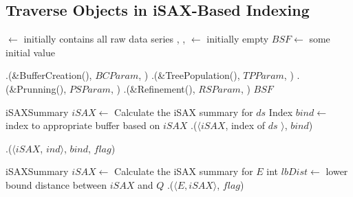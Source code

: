 \subsection{Traverse Objects in iSAX-Based Indexing}

\begin{algorithm}[htbp]
    \footnotesize
    \vspace*{2mm}
    
    \begin{algorithmic}[1]
    
        \State \BC $\gets$ initially contains all raw data series
        \State \TP, \PS, \RS $\gets$ initially empty
        \State $\mathit{BSF} \gets$ some initial value
    \EndProcedure
    
    \vspace*{1mm}
    \vspace*{1mm}

        \State \BC.\Traverse(\&BufferCreation(), $\mathit{BCParam}$, \False)
        \State \TP.\Traverse(\&TreePopulation(), $\mathit{TPParam}$, \False)
        \State \PS.\Traverse(\&Prunning(), $\mathit{PSParam}$, \False)
        \State \RS.\Traverse(\&Refinement(), $\mathit{RSParam}$, \True)
        \State \Return $\mathit{BSF}$
    \EndProcedure
    
    \vspace*{1mm}
        \State iSAXSummary $\mathit{iSAX} \gets$ Calculate the iSAX summary for $\mathit{ds}$
        \State Index $\mathit{bind} \gets$ index to appropriate buffer based on $\mathit{iSAX}$
        \State \TP.\Put($\langle \mathit{iSAX}$, index of $\mathit{ds}$ $\rangle$, $\mathit{bind}$)
    \EndProcedure
    
    \vspace*{1mm}
        \State \PS.\Put($\langle \mathit{iSAX}$, $\mathit{ind} \rangle$, $\mathit{bind}$, $\mathit{flag}$)
    \EndProcedure
    
    \vspace*{1mm}
            \State iSAXSummary $\mathit{iSAX} \gets$ Calculate the iSAX summary for $\mathit{E}$
            \State int $\mathit{lbDist} \gets$ lower bound distance between $\mathit{iSAX}$ and $Q$
                \State \RS.\Put($\langle \mathit{E, iSAX} \rangle$, $\mathit{flag}$)
                \Return \True
            \EndIf
            \Return \False
    \EndProcedure
    

\end{algorithmic}
\end{algorithm}
